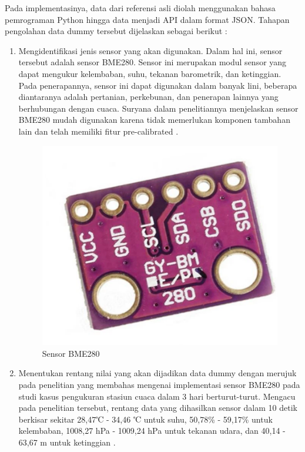 \begin{enumerate}[label={\alph*.}]
	Pada implementasinya, data dari referensi asli diolah menggunakan bahasa pemrograman Python hingga data menjadi API dalam format JSON. Tahapan pengolahan data dummy tersebut dijelaskan sebagai berikut : \\
	\begin{enumerate}[label={\arabic*.}]
		\item Mengidentifikasi jenis sensor yang akan digunakan. Dalam hal ini, sensor tersebut adalah sensor BME280. Sensor ini merupakan modul sensor yang dapat mengukur kelembaban, suhu, tekanan barometrik, dan ketinggian. Pada penerapannya, sensor ini dapat digunakan dalam banyak lini, beberapa diantaranya adalah pertanian, perkebunan, dan penerapan lainnya yang berhubungan dengan cuaca. Suryana dalam penelitiannya menjelaskan sensor BME280 mudah digunakan karena tidak memerlukan komponen tambahan lain dan telah memiliki fitur pre-calibrated \cite{Suryana2022}.
		\begin{figure}[H]
			\centering
			\includegraphics[width=0.8\linewidth]{gambar/Dasar teori/Sensor BME280.png}
			\caption{Sensor BME280}
			\label{gambar1}
		\end{figure}
		
		\item Menentukan rentang nilai yang akan dijadikan data dummy dengan merujuk pada penelitian yang membahas mengenai implementasi sensor BME280 pada studi kasus pengukuran stasiun cuaca dalam 3 hari berturut-turut. Mengacu pada penelitian tersebut, rentang data yang dihasilkan sensor dalam 10 detik berkisar sekitar 28,47℃ - 34,46 ℃ untuk suhu, 50,78\% - 59,17\% untuk kelembaban, 1008,27 hPa - 1009,24 hPa untuk tekanan udara, dan 40,14 - 63,67 m untuk ketinggian \cite{Triawan2023}. 
		

\end{enumerate}
\end{enumerate}

